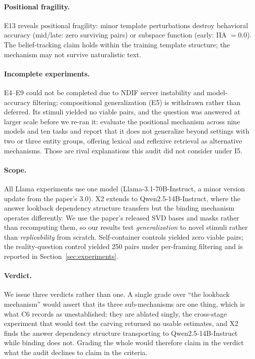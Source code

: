 \documentclass{article}
\begin{document}
\paragraph{Positional fragility.}
E13 reveals positional fragility: minor template perturbations destroy behavioral accuracy (mid/late: zero surviving pairs) or subspace function (early: IIA $= 0.0$). The belief-tracking claim holds within the training template structure; the mechanism may not survive naturalistic text.

\paragraph{Incomplete experiments.}
E4--E9 could not be completed due to NDIF server instability and model-accuracy filtering; compositional generalization (E5) is withdrawn rather than deferred. Its stimuli yielded no viable pairs, and the question was answered at larger scale before we re-ran it: \citet{gurarieh2025mixing} evaluate the positional mechanism across nine models and ten tasks and report that it does not generalize beyond settings with two or three entity groups, offering lexical and reflexive retrieval as alternative mechanisms. Those are rival explanations this audit did not consider under I5.

\paragraph{Scope.}
All Llama experiments use one model (Llama-3.1-70B-Instruct, a minor version update from the paper's 3.0). X2 extends to Qwen2.5-14B-Instruct, where the answer lookback dependency structure transfers but the binding mechanism operates differently. We use the paper's released SVD bases and masks rather than recomputing them, so our results test \emph{generalization} to novel stimuli rather than \emph{replicability} from scratch. Self-container controls yielded zero viable pairs; the reality-question control yielded 250 pairs under per-framing filtering and is reported in Section~\ref{sec:experiments}.

\paragraph{Verdict.}
We issue three verdicts rather than one. A single grade over ``the lookback mechanism''
would assert that its three sub-mechanisms are one thing, which is what C6 records as
unestablished: they are ablated singly, the cross-stage experiment that would test the
carving returned no usable estimates, and X2 finds the answer dependency structure
transporting to Qwen2.5-14B-Instruct while binding does not. Grading the whole would
therefore claim in the verdict what the audit declines to claim in the criteria.
\end{document}

